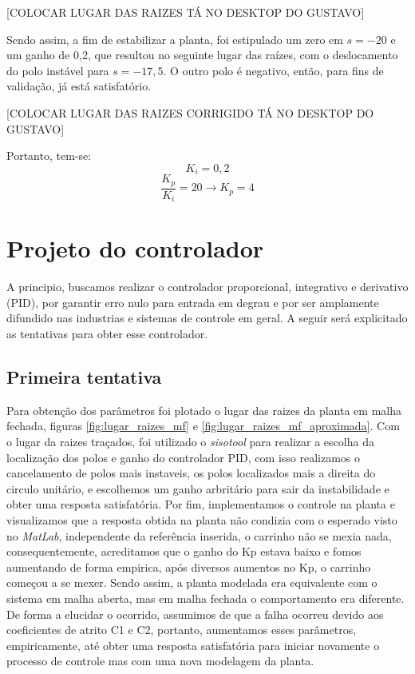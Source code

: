 \documentclass{ifacconf}
\begin{document}
[COLOCAR LUGAR DAS RAIZES TÁ NO DESKTOP DO GUSTAVO]

Sendo assim, a fim de estabilizar a planta, foi estipulado um zero em $s = -20$ e um ganho de 0,2, que resultou no seguinte lugar das raízes, com o deslocamento do polo instável para $s = -17,5$. O outro polo é negativo, então, para fins de validação, já está satisfatório.

[COLOCAR LUGAR DAS RAIZES CORRIGIDO TÁ NO DESKTOP DO GUSTAVO]

Portanto, tem-se:
\begin{equation}
    K_i = 0,2
\end{equation}
\begin{equation}
    \frac{K_p}{K_i} = 20 \rightarrow K_p = 4
\end{equation}
\section{Projeto do controlador}

A principio, buscamos realizar o controlador proporcional, integrativo e derivativo (PID), 
por garantir erro nulo para entrada em degrau e por ser amplamente difundido nas industrias
e sistemas de controle em geral. A seguir será explicitado as tentativas para obter esse controlador.

\subsection{Primeira tentativa} %
Para obtenção dos parâmetros foi plotado o lugar das raizes da planta em malha fechada, figuras \ref{fig:lugar_raizes_mf} e \ref{fig:lugar_raizes_mf_aproximada}.
Com o lugar da raizes traçados, foi utilizado o \textit{sisotool} para realizar a escolha da localização dos polos e ganho do controlador PID, com isso realizamos
o cancelamento de polos mais instaveis, os polos localizados mais a direita do circulo unitário, e escolhemos um ganho arbritário para sair da instabilidade e obter
uma resposta satisfatória. Por fim, implementamos o controle na planta e visualizamos que a resposta obtida na planta não condizia com o esperado visto no \textit{MatLab},
independente da referência inserida, o carrinho não se mexia nada, consequentemente, acreditamos que o ganho do Kp estava baixo e fomos aumentando de forma empirica, 
após diversos aumentos no Kp, o carrinho começou a se mexer. Sendo assim, a planta modelada era equivalente com o sistema em malha aberta, mas em malha fechada o comportamento
era diferente. De forma a elucidar o ocorrido, assumimos de que a falha ocorreu devido aos coeficientes de atrito C1 e C2, portanto, aumentamos esses parâmetros, empiricamente, até
obter uma resposta satisfatória para iniciar novamente o processo de controle mas com uma nova modelagem da planta. 
\end{document}
